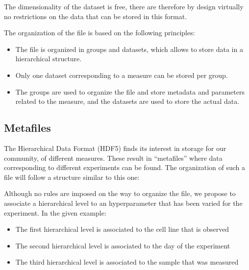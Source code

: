\documentclass[letterpaper,10pt,english]{sphinxmanual}
\begin{document}
\sphinxAtStartPar
The dimensionality of the dataset is free, there are therefore by design virtually no restrictions on the data that can be stored in this format.

\sphinxAtStartPar
The organization of the file is based on the following principles:
\begin{itemize}
\item {} 
\sphinxAtStartPar
The file is organized in groups and datasets, which allows to store data in a hierarchical structure.

\item {} 
\sphinxAtStartPar
Only one dataset corresponding to a measure can be stored per group.

\item {} 
\sphinxAtStartPar
The groups are used to organize the file and store metadata and parameters related to the measure, and the datasets are used to store the actual data.

\end{itemize}


\subsection{Meta\sphinxhyphen{}files}
\label{\detokenize{source/file_format:meta-files}}
\sphinxAtStartPar
The Hierarchical Data Format (HDF5) finds its interest in storage for our community, of different measures. These result in “meta\sphinxhyphen{}files” where data corresponding to different experiments can be found. The organization of such a file will follow a structure similar to this one:

\sphinxAtStartPar
Although no rules are imposed on the way to organize the file, we propose to associate a hierarchical level to an hyperparameter that has been varied for the experiment. In the given example:
\begin{itemize}
\item {} 
\sphinxAtStartPar
The first hierarchical level is associated to the cell line that is observed

\item {} 
\sphinxAtStartPar
The second hierarchical level is associated to the day of the experiment

\item {} 
\sphinxAtStartPar
The third hierarchical level is associated to the sample that was measured

\end{itemize}
\end{document}
